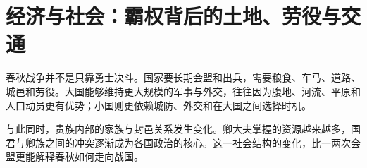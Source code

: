 \section{经济与社会：霸权背后的土地、劳役与交通}

春秋战争并不是只靠勇士决斗。国家要长期会盟和出兵，需要粮食、车马、道路、城邑和劳役。大国能够维持更大规模的军事与外交，往往因为腹地、河流、平原和人口动员更有优势；小国则更依赖城防、外交和在大国之间选择时机。

与此同时，贵族内部的家族与封邑关系发生变化。卿大夫掌握的资源越来越多，国君与卿族之间的冲突逐渐成为各国政治的核心。这一社会结构的变化，比一两次会盟更能解释春秋如何走向战国。
